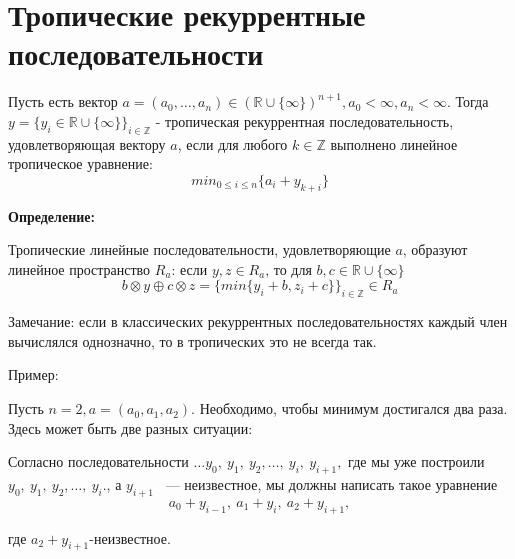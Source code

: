 \documentclass[russian]{lecture-notes}
\begin{document}
\section{Тропические рекуррентные последовательности}
\begin{Definition}
	Пусть есть вектор $a=(a_0,\ldots ,a_n)\in (\mathbb{R} \cup \{\infty\})^{n+1}, a_0<\infty , a_n<\infty$. Тогда $y=\{y_i\in \mathbb{R}\cup \{\infty\}\}_{i\in\mathbb{Z}}$ - тропическая рекуррентная последовательность, удовлетворяющая вектору $a$, если для любого $k\in\mathbb{Z}$ выполнено линейное тропическое уравнение:
	\[
	min_{0\le i\le n}\{a_i+y_{k+i}\}
	\]
\end{Definition}
\bfseries Определение: \mdseries


Тропические линейные последовательности, удовлетворяющие $a$, образуют линейное пространство $R_a$: если $y, z \in R_a $, то для $b, c\in \mathbb{R}\cup\{\infty\}$
\[
b\otimes y\oplus c\otimes z=\{min\{y_i+b, z_i+c\}\}_{i\in\mathbb{Z}}\in R_a
\]

Замечание: если в классических рекуррентных последовательностях каждый член вычислялся однозначно, то в тропических это не всегда так.


Пример:

Пусть $n=2, a=(a_0, a_1, a_2).$
Необходимо, чтобы минимум достигался два раза. Здесь может быть две разных ситуации:

Согласно последовательности $
 \ldots y_0,\:y_1,\:y_2,\ldots,\:y_i,\:y_{i+1},$
где мы уже построили $y_0,\:y_1,\:y_2,\ldots,\:y_i.$, а $y_{i+1}$ ~--- неизвестное, мы должны написать такое уравнение
\[
a_0+y_{i-1},\:a_1+y_i,\:a_2+y_{i+1},
\]


где $a_2+y_{i+1}$-неизвестное.
\vspace{\baselineskip}
\end{document}
